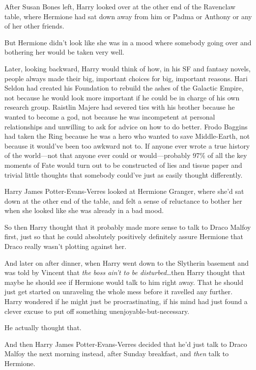 After Susan Bones left, Harry looked over at the other end of the Ravenclaw table, where Hermione had sat down away from him or Padma or Anthony or any of her other friends.

But Hermione didn’t look like she was in a mood where somebody going over and bothering her would be taken very well.

Later, looking backward, Harry would think of how, in his SF and fantasy novels, people always made their big, important choices for big, important reasons. Hari Seldon had created his Foundation to rebuild the ashes of the Galactic Empire, not because he would look more important if he could be in charge of his own research group. Raistlin Majere had severed ties with his brother because he wanted to become a god, not because he was incompetent at personal relationships and unwilling to ask for advice on how to do better. Frodo Baggins had taken the Ring because he was a hero who wanted to save Middle-Earth, not because it would’ve been too awkward not to. If anyone ever wrote a true history of the world—not that anyone ever could or would—probably 97\% of all the key moments of Fate would turn out to be constructed of lies and tissue paper and trivial little thoughts that somebody could’ve just as easily thought differently.

Harry James Potter-Evans-Verres looked at Hermione Granger, where she’d sat down at the other end of the table, and felt a sense of reluctance to bother her when she looked like she was already in a bad mood.

So then Harry thought that it probably made more sense to talk to Draco Malfoy first, just so that he could absolutely positively definitely assure Hermione that Draco really wasn’t plotting against her.

And later on after dinner, when Harry went down to the Slytherin basement and was told by Vincent that \emph{the boss ain’t to be disturbed}…then Harry thought that maybe he should see if Hermione would talk to him right away. That he should just get started on unraveling the whole mess before it ravelled any further. Harry wondered if he might just be procrastinating, if his mind had just found a clever excuse to put off something unenjoyable-but-necessary.

He actually thought that.

And then Harry James Potter-Evans-Verres decided that he’d just talk to Draco Malfoy the next morning instead, after Sunday breakfast, and \emph{then} talk to Hermione.

